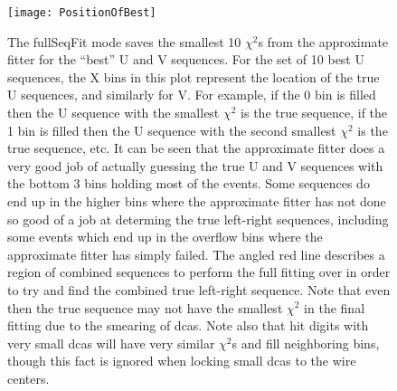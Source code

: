 			\begin{figure}[]
				\caption{The fullSeqFit mode saves the smallest 10 $\chi^{2}$s from the approximate fitter for the ``best'' U and V sequences. For the set of 10 best U sequences, the X bins in this plot represent the location of the true U sequences, and similarly for V. For example, if the 0 bin is filled then the U sequence with the smallest $\chi^{2}$ is the true sequence, if the 1 bin is filled then the U sequence with the second smallest $\chi^{2}$ is the true sequence, etc. It can be seen that the approximate fitter does a very good job of actually guessing the true U and V sequences with the bottom 3 bins holding most of the events. Some sequences do end up in the higher bins where the approximate fitter has not done so good of a job at determing the true left-right sequences, including some events which end up in the overflow bins where the approximate fitter has simply failed. The angled red line describes a region of combined sequences to perform the full fitting over in order to try and find the combined true left-right sequence. Note that even then the true sequence may not have the smallest $\chi^{2}$ in the final fitting due to the smearing of dcas. Note also that hit digits with very small dcas will have very similar $\chi^{2}$s and fill neighboring bins, though this fact is ignored when locking small dcas to the wire centers.}
				\centering
				\texttt{[image: PositionOfBest]}
				\label{fig:PositionOfBest}
			\end{figure}


    


